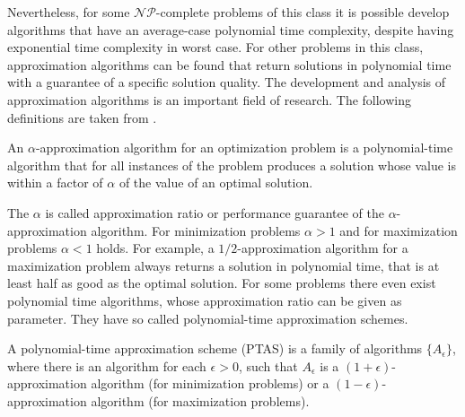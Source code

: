 Nevertheless, for some $\mathcal{NP}$-complete problems of this class it is possible develop algorithms that have an average-case polynomial time complexity, despite having exponential time complexity in worst case. For other problems in this class, approximation algorithms can be found that return solutions in polynomial time with a guarantee of a specific solution quality. The development and analysis of approximation algorithms is an important field of research. The following definitions are taken from \cite{williamson-10}.
\begin{definition}
An $\alpha$-approximation algorithm for an optimization problem is a polynomial-time algorithm that for all instances of the problem produces a solution whose value is within a factor of $\alpha$ of the value of an optimal solution.
\end{definition}
The $\alpha$ is called approximation ratio or performance guarantee of the $\alpha$-approximation algorithm. For minimization problems $\alpha > 1$ and for maximization problems $\alpha < 1$ holds. For example, a $1/2$-approximation algorithm for a maximization problem always returns a solution in polynomial time, that is at least half as good as the optimal solution. For some problems there even exist polynomial time algorithms, whose approximation ratio can be given as parameter. They have so called polynomial-time approximation schemes.
\begin{definition}
A polynomial-time approximation scheme (PTAS) is a family of algorithms $\{A_{\epsilon}\}$, where there is an algorithm for each $\epsilon > 0$, such that $A_{\epsilon}$ is a $(1+\epsilon)$-approximation algorithm (for minimization problems) or a $(1-\epsilon)$-approximation algorithm (for maximization problems).
\end{definition}
